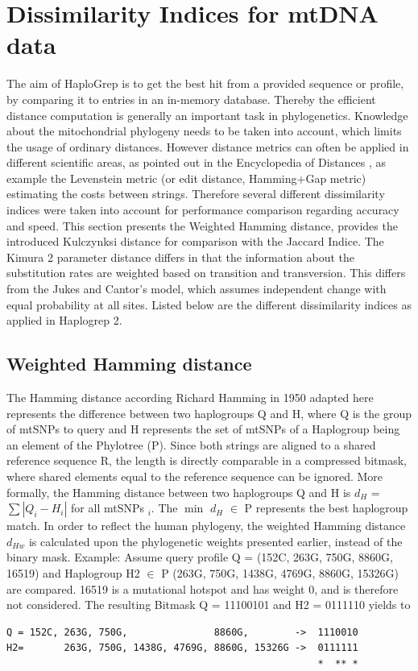 \section{Dissimilarity Indices for mtDNA data}\label{hg:dissimilarity}
\label{subs:distance}
The aim of HaploGrep is to get the best hit from a provided sequence or profile, by comparing it to entries in an in-memory database. Thereby the efficient distance computation is generally an important task in phylogenetics. Knowledge about the mitochondrial phylogeny needs to be taken into account, which limits the usage of ordinary distances. However distance metrics can often be applied in different scientific areas, as pointed out in the Encyclopedia of Distances \cite{Deza2009}, as example the Levenstein metric (or edit distance, Hamming+Gap metric) estimating the costs between strings. Therefore several different dissimilarity indices were taken into account for performance comparison regarding accuracy and speed. This section presents the Weighted Hamming distance, provides the introduced Kulczynksi distance for comparison with the Jaccard Indice. The Kimura 2 parameter distance differs in that the information about the substitution rates are weighted based on transition and transversion. This differs from the Jukes and Cantor's model, which assumes independent change with equal probability at all sites. Listed below are the different dissimilarity indices as applied in Haplogrep 2.

\subsection{Weighted Hamming distance}
\label{hamming}
The Hamming distance according Richard Hamming in 1950 adapted here represents the difference between two haplogroups Q and H, where Q is the group of mtSNPs to query and H represents the set of mtSNPs of a Haplogroup being an element of the Phylotree (P). Since both strings are aligned to a shared reference sequence R, the length is directly comparable in a compressed bitmask, where shared elements equal to the reference sequence can be ignored. More formally, the Hamming distance between two haplogroups Q and H is $d_H$ =  $\sum\left|Q_i-H_i\right|$ for all mtSNPs $_i$. The $\min$ $d_H$ $\in$ P represents the best haplogroup match. In order to reflect the human phylogeny, the weighted Hamming distance $d_{Hw}$ is calculated upon the phylogenetic weights presented earlier, instead of the binary mask.
Example: Assume query profile Q = (152C, 263G, 750G, 8860G, 16519) and Haplogroup H2 $\in$ P (263G, 750G, 1438G, 4769G, 8860G, 15326G) are compared. 16519 is a mutational hotspot and has weight 0, and is therefore not considered. The resulting Bitmask Q = 11100101 and H2 = 0111110 yields to 
\begin{verbatim}
Q = 152C, 263G, 750G,               8860G,        ->  1110010
H2=       263G, 750G, 1438G, 4769G, 8860G, 15326G ->  0111111
                                                      *  ** *
\end{verbatim}


